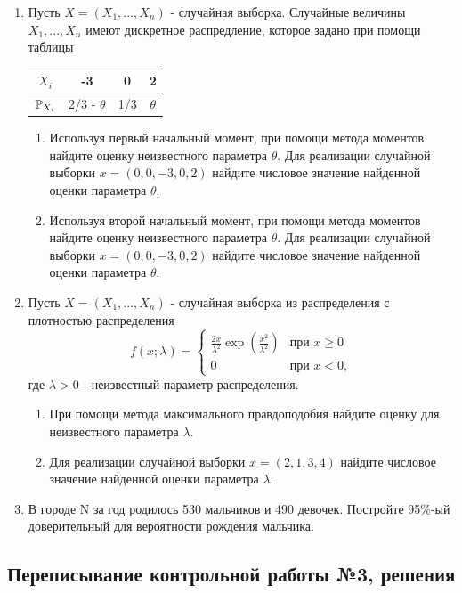 \documentclass[12pt, a4paper]{article}\usepackage[]{graphicx}\usepackage[]{color}
\begin{document}
\begin{enumerate}
  \item Пусть $X = (X_1, ..., X_n)$ - случайная выборка. Случайные величины $X_1, ..., X_n$ имеют дискретное распредление, которое задано при помощи таблицы

  \begin{tabular}{c|ccc}
    $X_i$ & -3 & 0 & 2 \\ \hline
    $\P_{X_i}$ & 2/3 - $\theta$ & 1/3 & $\theta$
  \end{tabular}

  \begin{enumerate}
  \item Используя первый начальный момент, при помощи метода моментов найдите оценку неизвестного параметра $\theta$. Для реализации случайной выборки $x = (0, 0, -3, 0, 2)$ найдите числовое значение найденной оценки параметра $\theta$.
  \item  Используя второй начальный момент, при помощи метода моментов найдите оценку неизвестного параметра $\theta$. Для реализации случайной выборки $x = (0, 0, -3, 0, 2)$ найдите числовое значение найденной оценки параметра $\theta$.
  \end{enumerate}

  \item Пусть $X = (X_1, ..., X_n)$ - случайная выборка из распределения с плотностью распределения
  \[
  f(x; \lambda) =
  \begin{cases}
    \frac{2x}{\lambda^2} \exp \left(\frac{x^2}{\lambda^2}\right) & \text{при } x \geq 0 \\
    0 & \text{при } x < 0,
  \end{cases}
  \]
  где $\lambda > 0 $ - неизвестный параметр распределения.
  \begin{enumerate}
  \item При помощи метода максимального правдоподобия найдите оценку для неизвестного параметра $\lambda$.
  \item Для реализации случайной выборки $x = (2, 1, 3, 4)$ найдите числовое значение найденной оценки параметра $\lambda$.
  \end{enumerate}

  \item В городе N за год родилось 530 мальчиков и 490 девочек. Постройте 95\%-ый доверительный для вероятности рождения мальчика.

\end{enumerate}

\subsection{Переписывание контрольной работы №3, решения}
\end{document}
